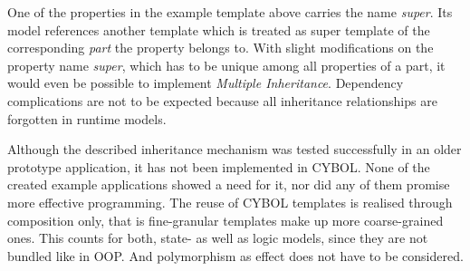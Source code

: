 One of the properties in the example template above carries the name
\emph{super}. Its model references another template which is treated as super
template of the corresponding \emph{part} the property belongs to. With slight
modifications on the property name \emph{super}, which has to be unique among
all properties of a part, it would even be possible to implement
\emph{Multiple Inheritance}. Dependency complications are not to be expected
because all inheritance relationships are forgotten in runtime models.

Although the described inheritance mechanism was tested successfully in an
older prototype application, it has not been implemented in CYBOL. None of the
created example applications showed a need for it, nor did any of them promise
more effective programming. The reuse of CYBOL templates is realised through
composition only, that is fine-granular templates make up more coarse-grained
ones. This counts for both, state- as well as logic models, since they are not
bundled like in OOP. And polymorphism as effect does not have to be considered.
